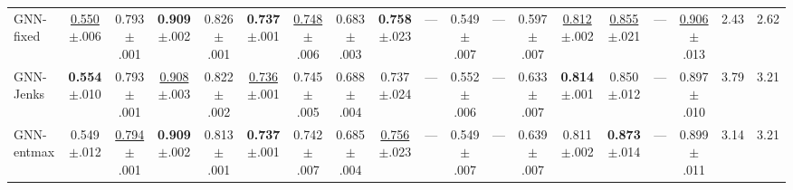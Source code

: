 \begin{table}[t]
{\begin{tabular}{lcccccccccccccccccc}
\midrule
GNN-fixed & \underline{0.550}{\scriptsize$\pm$.006} & 0.793{\scriptsize$\pm$.001} & \textbf{0.909}{\scriptsize$\pm$.002} & 0.826{\scriptsize$\pm$.001} & \textbf{0.737}{\scriptsize$\pm$.001} & \underline{0.748}{\scriptsize$\pm$.006} & 0.683{\scriptsize$\pm$.003} & \textbf{0.758}{\scriptsize$\pm$.023} & --- & 0.549{\scriptsize$\pm$.007} & --- & 0.597{\scriptsize$\pm$.007} & \underline{0.812}{\scriptsize$\pm$.002} & \underline{0.855}{\scriptsize$\pm$.021} & --- & \underline{0.906}{\scriptsize$\pm$.013} & 2.43 & 2.62 \\
GNN-Jenks & \textbf{0.554}{\scriptsize$\pm$.010} & 0.793{\scriptsize$\pm$.001} & \underline{0.908}{\scriptsize$\pm$.003} & 0.822{\scriptsize$\pm$.002} & \underline{0.736}{\scriptsize$\pm$.001} & 0.745{\scriptsize$\pm$.005} & 0.688{\scriptsize$\pm$.004} & 0.737{\scriptsize$\pm$.024} & --- & 0.552{\scriptsize$\pm$.006} & --- & 0.633{\scriptsize$\pm$.007} & \textbf{0.814}{\scriptsize$\pm$.001} & 0.850{\scriptsize$\pm$.012} & --- & 0.897{\scriptsize$\pm$.010} & 3.79 & 3.21 \\
GNN-entmax & 0.549{\scriptsize$\pm$.012} & \underline{0.794}{\scriptsize$\pm$.001} & \textbf{0.909}{\scriptsize$\pm$.002} & 0.813{\scriptsize$\pm$.001} & \textbf{0.737}{\scriptsize$\pm$.001} & 0.742{\scriptsize$\pm$.007} & 0.685{\scriptsize$\pm$.004} & \underline{0.756}{\scriptsize$\pm$.023} & --- & 0.549{\scriptsize$\pm$.007} & --- & 0.639{\scriptsize$\pm$.007} & 0.811{\scriptsize$\pm$.002} & \textbf{0.873}{\scriptsize$\pm$.014} & --- & 0.899{\scriptsize$\pm$.011} & 3.14 & 3.21 \\
\bottomrule
\end{tabular}}
\end{table}
